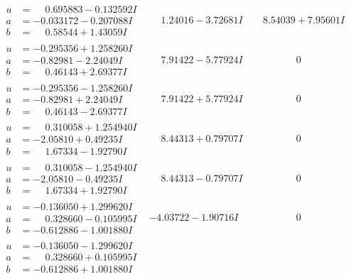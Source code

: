 \documentclass[1p]{elsarticle_modified}
\theoremstyle{definition}
\begin{document}
$$\begin{array}{c|c|c}
\begin{aligned}
u &= \phantom{-}0.695883 - 0.132592 I \\
a &= -0.033172 - 0.207088 I \\
b &= \phantom{-}0.58544 + 1.43059 I\end{aligned}
 & \phantom{-}1.24016 - 3.72681 I & \phantom{-}8.54039 + 7.95601 I \\ \hline\begin{aligned}
u &= -0.295356 + 1.258260 I \\
a &= -0.82981 - 2.24049 I \\
b &= \phantom{-}0.46143 + 2.69377 I\end{aligned}
 & \phantom{-}7.91422 - 5.77924 I & \phantom{-0.000000 } 0 \\ \hline\begin{aligned}
u &= -0.295356 - 1.258260 I \\
a &= -0.82981 + 2.24049 I \\
b &= \phantom{-}0.46143 - 2.69377 I\end{aligned}
 & \phantom{-}7.91422 + 5.77924 I & \phantom{-0.000000 } 0 \\ \hline\begin{aligned}
u &= \phantom{-}0.310058 + 1.254940 I \\
a &= -2.05810 + 0.49235 I \\
b &= \phantom{-}1.67334 - 1.92790 I\end{aligned}
 & \phantom{-}8.44313 + 0.79707 I & \phantom{-0.000000 } 0 \\ \hline\begin{aligned}
u &= \phantom{-}0.310058 - 1.254940 I \\
a &= -2.05810 - 0.49235 I \\
b &= \phantom{-}1.67334 + 1.92790 I\end{aligned}
 & \phantom{-}8.44313 - 0.79707 I & \phantom{-0.000000 } 0 \\ \hline\begin{aligned}
u &= -0.136050 + 1.299620 I \\
a &= \phantom{-}0.328660 - 0.105995 I \\
b &= -0.612886 - 1.001880 I\end{aligned}
 & -4.03722 - 1.90716 I & \phantom{-0.000000 } 0 \\ \hline\begin{aligned}
u &= -0.136050 - 1.299620 I \\
a &= \phantom{-}0.328660 + 0.105995 I \\
b &= -0.612886 + 1.001880 I\end{aligned}

\end{array}$$
\end{document}
